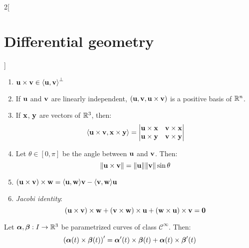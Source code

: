 \documentclass[../../../main_math.tex]{subfiles}
\begin{document}
\begin{multicols}{2}[\section{Differential geometry}]
\begin{proposition}
\begin{enumerate}
      \item $\vf{u}\times\vf{v}\in{\langle\vf{u},\vf{v}\rangle}^{\perp}$
      \item If $\vf{u}$ and $\vf{v}$ are linearly independent, $(\vf{u},\vf{v},\vf{u}\times\vf{v})$ is a positive basis of $\RR^n$.
      \item If $\vf{x}$, $\vf{y}$ are vectors of $\RR^3$, then: $$\langle\vf{u}\times\vf{v},\vf{x}\times\vf{y}\rangle=
              \begin{vmatrix}
                \vf{u}\times\vf{x} & \vf{v}\times\vf{x} \\
                \vf{u}\times\vf{y} & \vf{v}\times\vf{y} \\
              \end{vmatrix}$$
      \item Let $\theta\in[0,\pi]$ be the angle between $\vf{u}$ and $\vf{v}$. Then: $$\|\vf{u}\times\vf{v}\|=\|\vf{u}\|\|\vf{v}\|\sin\theta$$
      \item $(\vf{u}\times\vf{v})\times\vf{w}=\langle\vf{u},\vf{w}\rangle\vf{v}-\langle\vf{v},\vf{w}\rangle\vf{u}$
      \item \emph{Jacobi identity}: $$(\vf{u}\times\vf{v})\times\vf{w}+(\vf{v}\times\vf{w})\times\vf{u}+(\vf{w}\times\vf{u})\times\vf{v}=\vf{0}$$
    \end{enumerate}
  \end{proposition}
  \begin{proposition}
    Let $\vf{\alpha},\vf{\beta}:I\rightarrow\RR^3$ be parametrized curves of class $\mathcal{C}^\infty$. Then:
    $${\left(\vf{\alpha}(t)\times\vf{\beta}(t)\right)}'=\vf{\alpha}'(t)\times\vf{\beta}(t)+\vf{\alpha}(t)\times\vf{\beta}'(t)$$
  \end{proposition}

\end{multicols}
\end{document}
